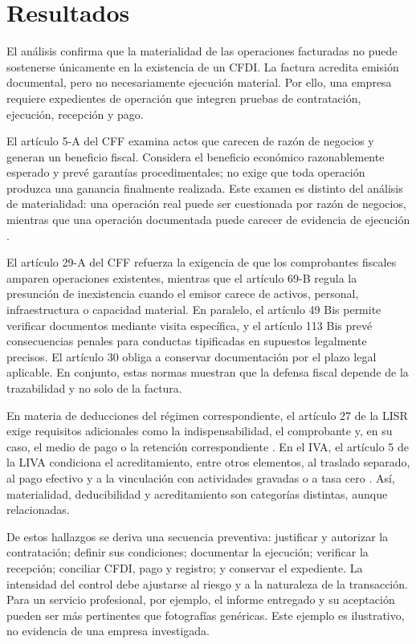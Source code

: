\documentclass[spanish,12pt,letterpaper,oneside]{article}
\begin{document}
\section{Resultados}
El análisis confirma que la materialidad de las operaciones facturadas no puede sostenerse únicamente en la existencia de un CFDI. La factura acredita emisión documental, pero no necesariamente ejecución material. Por ello, una empresa requiere expedientes de operación que integren pruebas de contratación, ejecución, recepción y pago.

El artículo 5-A del CFF examina actos que carecen de razón de negocios y generan un beneficio fiscal. Considera el beneficio económico razonablemente esperado y prevé garantías procedimentales; no exige que toda operación produzca una ganancia finalmente realizada. Este examen es distinto del análisis de materialidad: una operación real puede ser cuestionada por razón de negocios, mientras que una operación documentada puede carecer de evidencia de ejecución \parencite[art. 5-A]{cff2026}.

El artículo 29-A del CFF refuerza la exigencia de que los comprobantes fiscales amparen operaciones existentes, mientras que el artículo 69-B regula la presunción de inexistencia cuando el emisor carece de activos, personal, infraestructura o capacidad material. En paralelo, el artículo 49 Bis permite verificar documentos mediante visita específica, y el artículo 113 Bis prevé consecuencias penales para conductas tipificadas en supuestos legalmente precisos. El artículo 30 obliga a conservar documentación por el plazo legal aplicable. En conjunto, estas normas muestran que la defensa fiscal depende de la trazabilidad y no solo de la factura.

En materia de deducciones del régimen correspondiente, el artículo 27 de la LISR exige requisitos adicionales como la indispensabilidad, el comprobante y, en su caso, el medio de pago o la retención correspondiente \parencite[art. 27]{lisr2024}. En el IVA, el artículo 5 de la LIVA condiciona el acreditamiento, entre otros elementos, al traslado separado, al pago efectivo y a la vinculación con actividades gravadas o a tasa cero \parencite[art. 5]{liva2021}. Así, materialidad, deducibilidad y acreditamiento son categorías distintas, aunque relacionadas.

De estos hallazgos se deriva una secuencia preventiva: justificar y autorizar la contratación; definir sus condiciones; documentar la ejecución; verificar la recepción; conciliar CFDI, pago y registro; y conservar el expediente. La intensidad del control debe ajustarse al riesgo y a la naturaleza de la transacción. Para un servicio profesional, por ejemplo, el informe entregado y su aceptación pueden ser más pertinentes que fotografías genéricas. Este ejemplo es ilustrativo, no evidencia de una empresa investigada.
\end{document}
